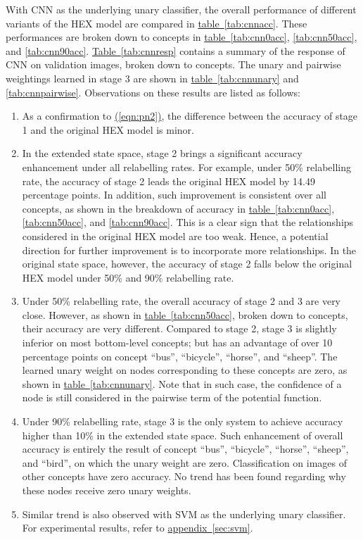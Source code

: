 \documentclass[11pt,a4paper]{article}
\begin{document}
With CNN as the underlying unary classifier, the overall performance of different variants of the HEX model are compared in \hyperref[tab:cnnacc]{table~\ref{tab:cnnacc}}. These performances are broken down to concepts in \hyperref[tab:cnn0acc]{table~\ref{tab:cnn0acc}}, \ref{tab:cnn50acc}, and \ref{tab:cnn90acc}. \hyperref[tab:cnnresp]{Table~\ref{tab:cnnresp}} contains a summary of the response of CNN on validation images, broken down to concepts. The unary and pairwise weightings learned in stage 3 are shown in \hyperref[tab:cnnunary]{table~\ref{tab:cnnunary}} and \ref{tab:cnnpairwise}. Observations on these results are listed as follows:
\begin{enumerate}
\item As a confirmation to \hyperref[eqn:pn2]{(\ref{eqn:pn2})}, the difference between the accuracy of stage 1 and the original HEX model is minor.
\item In the extended state space, stage 2 brings a significant accuracy enhancement under all relabelling rates. For example, under 50\% relabelling rate, the accuracy of stage 2 leads the original HEX model by 14.49 percentage points. In addition, such improvement is consistent over all concepts, as shown in the breakdown of accuracy in \hyperref[tab:cnn0acc]{table~\ref{tab:cnn0acc}}, \ref{tab:cnn50acc}, and \ref{tab:cnn90acc}. This is a clear sign that the relationships considered in the original HEX model are too weak. Hence, a potential direction for further improvement is to incorporate more relationships. In the original state space, however, the accuracy of stage 2 falls below the original HEX model under 50\% and 90\% relabelling rate.
\item Under 50\% relabelling rate, the overall accuracy of stage 2 and 3 are very close. However, as shown in \hyperref[tab:cnn0acc]{table~\ref{tab:cnn50acc}}, broken down to concepts, their accuracy are very different. Compared to stage 2, stage 3 is slightly inferior on most bottom-level concepts; but has an advantage of over 10 percentage points on concept ``bus'', ``bicycle'', ``horse'', and ``sheep''. The learned unary weight on nodes corresponding to these concepts are zero, as shown in \hyperref[tab:cnnunary]{table~\ref{tab:cnnunary}}. Note that in such case, the confidence of a node is still considered in the pairwise term of the potential function.
\item Under 90\% relabelling rate, stage 3 is the only system to achieve accuracy higher than 10\% in the extended state space. Such enhancement of overall accuracy is entirely the result of concept ``bus'', ``bicycle'', ``horse'', ``sheep'', and ``bird'', on which the unary weight are zero. Classification on images of other concepts have zero accuracy. No trend has been found regarding why these nodes receive zero unary weights.
\item Similar trend is also observed with SVM as the underlying unary classifier. For experimental results, refer to \hyperref[sec:svm]{appendix~\ref{sec:svm}}.
\end{enumerate}
\end{document}
